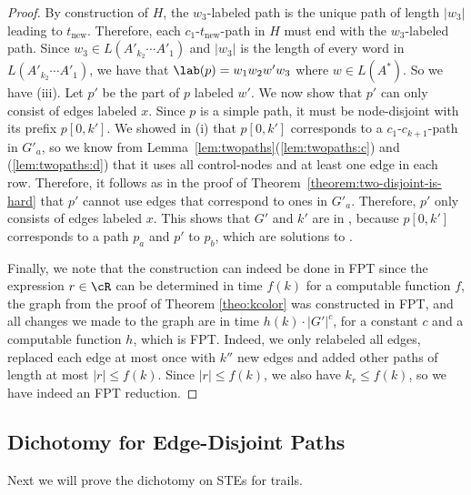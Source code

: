 \documentclass[a4paper,english]{lipics-v2016}
\theoremstyle{plain}
\begin{document}
\begin{proof}
By construction of $H$, the $w_3$-labeled path is the unique path of
length $|w_3|$ leading to $t_\text{new}$. Therefore, each
$c_1$-$t_\text{new}$-path in $H$ must end with the $w_3$-labeled
path. Since $w_3 \in L(A'_{k_2} \cdots A'_1)$ and $|w_3|$ is the
length of every word in $L(A'_{k_2} \cdots A'_1)$, we have that
$\lab(p) = w_1 w_2 w' w_3$ where $w\in L(A^*)$. So we have (iii).  Let
$p'$ be the part of $p$ labeled $w'$.  We now show that $p'$ can only
consist of edges labeled $x$.  Since $p$ is a simple path, it must be
node-disjoint with its prefix $p[0,k']$. We showed in (i) that
$p[0,k']$ corresponds to a $c_1$-$c_{k+1}$-path in $G'_a$, so we know
from Lemma~\ref{lem:twopaths}(\ref{lem:twopaths:c}) and
(\ref{lem:twopaths:d}) that it uses all control-nodes and at least one
edge in each row. Therefore, it follows as in the proof of
Theorem~\ref{theorem:two-disjoint-is-hard} that $p'$ cannot use edges
that correspond to ones in $G'_a$.  Therefore, $p'$ only consists of
edges labeled $x$.  This shows that $G'$ and $k'$ are in
\knodecolordisjointpaths, because $p[0,k']$ corresponds to a path
$p_a$ and $p'$ to $p_b$, which are solutions to
\knodecolordisjointpaths.

Finally, we note that the construction can indeed be done in FPT since
the expression $r \in \cR$ can be determined in time $f(k)$ for a
computable function $f$, the graph from the proof of Theorem
\ref{theo:kcolor} was constructed in FPT, and all changes
we made to the graph are in time $ h(k) \cdot |G'|^c$, for a constant $c$ and a computable function $h$, which is FPT. Indeed, we only relabeled
all edges, replaced each edge at most once with $k''$ new edges and
added other paths of length at most $|r|\leq f(k)$. Since $|r|\leq f(k)$, we also have $k_r\leq f(k)$, so we have indeed an FPT reduction.
\end{proof}


\subsection{Dichotomy for Edge-Disjoint Paths}

Next we will prove the dichotomy on STEs for trails. 
\end{document}
